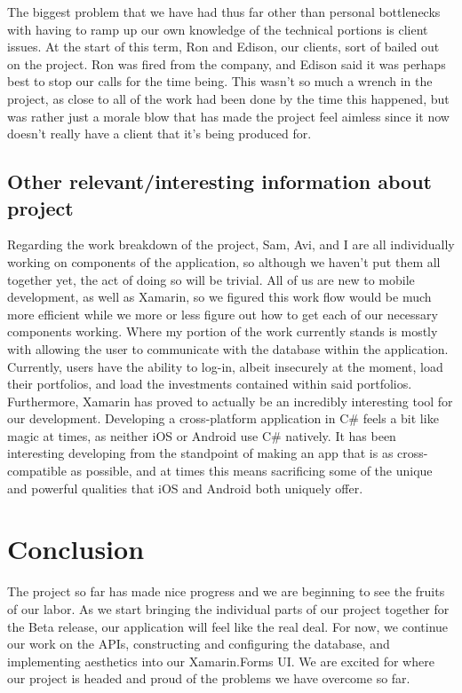 \documentclass[letterpaper,10pt,titlepage,journal,compsoc,draftclsnofoot,onecolumn]{IEEEtran}
\begin{document}
The biggest problem that we have had thus far other than personal bottlenecks with having to ramp up our own knowledge of the technical portions is client issues. At the start of this term, Ron and Edison, our clients, sort of bailed out on the project. Ron was fired from the company, and Edison said it was perhaps best to stop our calls for the time being. This wasn't so much a wrench in the project, as close to all of the work had been done by the time this happened, but was rather just a morale blow that has made the project feel aimless since it now doesn't really have a client that it's being produced for.

\subsection{Other relevant/interesting information about project}
Regarding the work breakdown of the project, Sam, Avi, and I are all individually working on components of the application, so although we haven't put them all together yet, the act of doing so will be trivial. All of us are new to mobile development, as well as Xamarin, so we figured this work flow would be much more efficient while we more or less figure out how to get each of our necessary components working. Where my portion of the work currently stands is mostly with allowing the user to communicate with the database within the application. Currently, users have the ability to log-in, albeit insecurely at the moment, load their portfolios, and load the investments contained within said portfolios. Furthermore, Xamarin has proved to actually be an incredibly interesting tool for our development. Developing a cross-platform application in C\# feels a bit like magic at times, as neither iOS or Android use C\# natively. It has been interesting developing from the standpoint of making an app that is as cross-compatible as possible, and at times this means sacrificing some of the unique and powerful qualities that iOS and Android both uniquely offer. 


\section{Conclusion}
The project so far has made nice progress and we are beginning to see the fruits of our labor. As we start bringing the individual parts of our project together for the Beta release, our application will feel like the real deal. For now, we continue our work on the APIs, constructing and configuring the database, and implementing aesthetics into our Xamarin.Forms UI. We are excited for where our project is headed and proud of the problems we have overcome so far.
\end{document}
